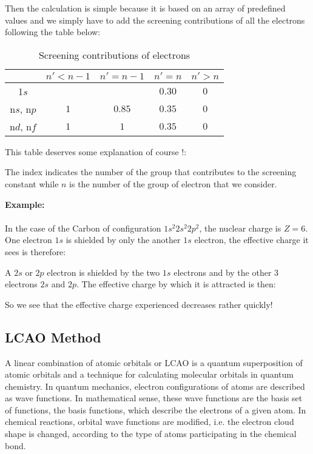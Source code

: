 	Then the calculation is simple because it is based on an array of predefined values and we simply have to add the screening contributions of all the electrons following the table below:
	\begin{table}[H]
		\centering
		\begin{tabular}{ccccc}\hline
		& $n'<n-1$ & $n'=n-1$ & $n'=n$ & $n'>n$ \\\hline
		1$s$ & & & $0.30$ & $0$ \\
		n$s$, n$p$ & $1$ & $0.85$ & $0.35$ & $0$ \\
		n$d$, n$f$ & $1$ & $1$ & $0.35$ & $0$\\ \hline
		\end{tabular}
		\caption{Screening contributions of electrons}
	\end{table}
	This table deserves some explanation of course !:
	
	The index indicates the number of the group that contributes to the screening constant while $n$ is the number of the group of electron that we consider.
	
	\pagebreak
	\begin{tcolorbox}[colframe=black,colback=white,sharp corners]
	\textbf{{\Large {}}Example:}\\\\
	In the case of the Carbon of configuration $1s^2 2s^2 2p^2$, the nuclear charge is $Z=6$. One electron $1s$ is shielded by only the another $1s$ electron, the effective charge it sees is therefore:
	
	A $2s$ or $2p$ electron is shielded by the two $1s$ electrons and by the other $3$ electrons $2s$ and $2p$. The effective charge by which it is attracted is then:
	
	So we see that the effective charge experienced decreases rather quickly!
	\end{tcolorbox}
	
	\subsection{LCAO Method}
	A linear combination of atomic orbitals or LCAO is a quantum superposition of atomic orbitals and a technique for calculating molecular orbitals in quantum chemistry. In quantum mechanics, electron configurations of atoms are described as wave functions. In mathematical sense, these wave functions are the basis set of functions, the basis functions, which describe the electrons of a given atom. In chemical reactions, orbital wave functions are modified, i.e. the electron cloud shape is changed, according to the type of atoms participating in the chemical bond.
	
